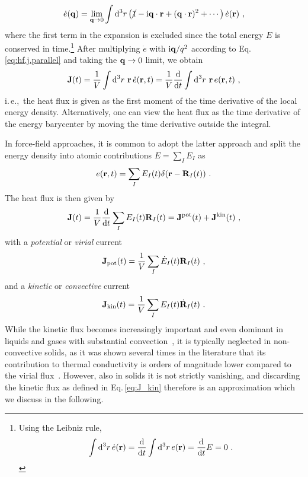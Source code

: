 \begin{align}
	\dot{e} (\b q) 
		= \lim_{\b q \to 0} \int \d^3 r \left(\cancel{1} - \im \b q \cdot \b r + (\b q \cdot \b r)^2 + \cdots \right) \dot{e} (\b r)~,
	\label{eq:hf.e.lw}
\end{align}
where the first term in the expansion is excluded since the total energy $E$ is conserved in time.\footnote{Using the  Leibniz rule,
\begin{align*}
	\int {\rm d}^3 r \, \dot{e} ({\bf r}) = \frac{{\rm d}}{{\rm d} t} \int {\rm d}^3 r \, e ({\bf r}) = \frac{{\rm d}}{{\rm d} t} E = 0~.
\end{align*}
}
After multiplying $\dot e$ with ${\rm i} {\bf q} / q^2$ according to Eq.\,\eqref{eq:hf.j.parallel} and taking the ${\bf q} \to 0$ limit, we obtain
\begin{align}
	\b J (t) 
		= \frac{1}{V} \int \d^3 r ~ \b r \, \dot{e} (\b r, t)
		= \frac{1}{V} \frac{\d}{\d t} \int \d^3 r ~ \b r \, e (\b r, t)
	~,
	\label{eq:hf.J}
\end{align}
i.\,e.,~the heat flux is given as the first moment of the time derivative of the local energy density. Alternatively, one can view the heat flux as the time derivative of the energy barycenter by moving the time derivative outside the integral.

In force-field approaches, it is common to adopt the latter approach and split the energy density into atomic contributions $E = \sum_I E_I$ as
\begin{align}
	e (\b r, t ) = \sum_I E_I (t) \delta (\b r - \b R_I (t))~.
	\label{eq:hf.e.atomic}
\end{align}
The heat flux is then given by~\cite{Helfand1960}
\begin{align}
	\b J (t) 
		= \frac{1}{V} \frac{\d}{\d t} \sum_I E_I(t) \b R_I(t)
		= {\bf J}^{\rm pot} (t) + {\bf J}^{\rm kin} (t)~,
	\label{eq:hf.J.atomic}
\end{align}
with a \emph{potential} or \emph{virial} current
\begin{align}
	{\bf J}_{\rm pot} (t)
		= \frac{1}{V} \sum_I \dot{E}_I (t) \b R_I (t)~,
	\label{eq:J_pot}
\end{align}
and a \emph{kinetic} or \emph{convective} current
\begin{align}
	{\bf J}_{\rm kin} (t)
		= \frac{1}{V} \sum_I E_I (t) \dot{\b R}_I (t)~.
	\label{eq:J_kin}
\end{align}
While the kinetic flux becomes increasingly important and even dominant in liquids and gases with substantial convection~\cite{Cheng2020}, it is typically neglected in non-convective solids, as it was shown several times in the literature that its contribution to thermal conductivity is orders of magnitude lower compared to the virial flux~\cite{Vogelsang1987,Kinaci2012}. However, also in solids it is not strictly vanishing, and discarding the kinetic flux as defined in Eq.\,\eqref{eq:J_kin} therefore is an approximation which we discuss in the following.

